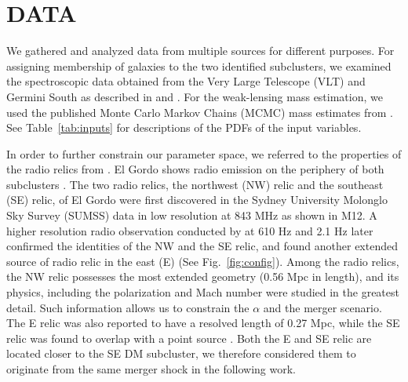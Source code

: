 \section{DATA} 
We gathered and analyzed data from multiple sources for different
purposes. For assigning membership of galaxies to the two identified subclusters, we
examined the spectroscopic data obtained from the Very Large Telescope (VLT) and
Germini South as described in  and \citet{Sifon13}.
For the weak-lensing mass estimation, we used the published
Monte Carlo Markov Chains (MCMC) mass estimates from .
See Table~\ref{tab:inputs} for descriptions of the PDFs of the input
variables. \par 
In order to further constrain our parameter space, we referred to the properties of
the radio relics from \citet{L13}. El Gordo shows radio emission on the
periphery of both subclusters . The two radio relics, the
northwest (NW) relic and the southeast (SE) relic, of El Gordo were first
discovered in the Sydney University Molonglo Sky Survey (SUMSS) data in low
resolution at 843 MHz \citep{Mauch03} as shown in M12. A higher
resolution radio observation conducted by \cite{L13} at 610 \mega Hz and
2.1 \giga Hz later confirmed the identities of the NW and the SE relic, and
found another extended source of radio relic in the east (E) (See Fig.~\ref{fig:config}). Among the radio relics, the NW relic possesses the most extended geometry
(0.56 Mpc in length), and its physics, including the
polarization and Mach number were studied in the greatest detail. Such
information allows us to constrain the $\alpha$ and the merger scenario. The E relic
was also reported to have a resolved length of 0.27 Mpc, while the SE relic
was found to overlap with a point source \citep{L13}. Both the E and SE
relic are located closer to the SE DM subcluster, we therefore considered them to
originate from the same merger shock in the following work.

